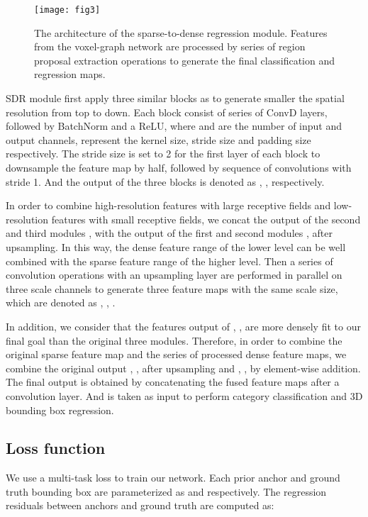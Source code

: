 \documentclass{article}
\begin{document}
\begin{wrapfigure}{r}{9.5cm}
\centering
\texttt{[image: fig3]}
\caption{The architecture of the sparse-to-dense regression module. Features from the voxel-graph network are processed by series of region proposal extraction operations to generate the final classification and regression maps.}
\label{fig:3}
\end{wrapfigure}
SDR module first apply three similar blocks as \cite{zhou2018voxelnet,lang2019pointpillars} to generate smaller the spatial resolution from top to down. Each block consist of series of ConvD layers, followed by BatchNorm and a ReLU, where  and  are the number of input and output channels,  represent the kernel size, stride size and padding size respectively. The stride size is set to 2 for the first layer of each block to downsample the feature map by half, followed by sequence of convolutions with stride 1. And the output of the three blocks is denoted as , ,  respectively.


In order to combine high-resolution features with large receptive fields and low-resolution features with small receptive fields, we concat the output of the second and third modules ,  with the output of the first and second modules ,  after upsampling. In this way, the dense feature range of the lower level can be well combined with the sparse feature range of the higher level. Then a series of convolution operations with an upsampling layer are performed in parallel on three scale channels to generate three feature maps with the same scale size, which are denoted as , , .

In addition, we consider that the features output of , ,  are more densely fit to our final goal than the original three modules. Therefore, in order to combine the original sparse feature map and the series of processed dense feature maps, we combine the original output , ,  after upsampling and , ,  by element-wise addition. The final output  is obtained by concatenating the fused feature maps after a  convolution layer. And  is taken as input to perform category classification and 3D bounding box regression.
\subsection{Loss function}
We use a multi-task loss to train our network. Each prior anchor and ground truth bounding box are parameterized as  and  respectively. The regression residuals between anchors and ground truth are computed as:
\end{document}
